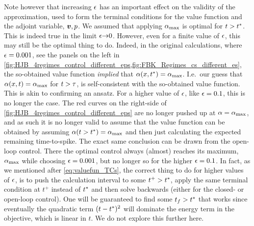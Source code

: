 \documentclass[12pt]{iopart}
\begin{document}
Note however that increasing ${\epsilon}$ has an important effect on the validity of
the approximation, used to form the terminal conditions for
the value function and the adjoint variable, ${ \boldsymbol{v} },p$. We assumed that applying
${ {\alpha}_{\textrm{max}} }$ is optimal for $t>{ t^* }$. This is indeed true in the
limit ${\epsilon} {\rightarrow} 0$. However, even for a finite value of ${\epsilon}$, this may still
be the optimal thing to do. Indeed, in the original calculations,
where ${\epsilon}=0.001$, see the panels on the left in
\cref{fig:HJB_4regimes_control_different_eps,fig:FBK_Regimes_cs_different_es},
the so-obtained value function {\sl implied} that ${\alpha}(x,{ t^* }) = { {\alpha}_{\textrm{max}} }$.
I.e.\ our
guess that ${\alpha}(x, t) = { {\alpha}_{\textrm{max}} }$ for $t > {\tau}$, is self-consistent with the
so-obtained value function. This is akin to confirming an ansatz.
For a higher value of ${\epsilon}$, like ${\epsilon} = 0.1$, this is no longer the case. The red
curves on the right-side of \cref{fig:HJB_4regimes_control_different_eps} are no
longer pushed up at ${\alpha} = { {\alpha}_{\textrm{max}} }$, and as such it is no longer valid to
assume that the value function can be obtained by assuming ${\alpha}(t>{ t^* }) = { {\alpha}_{\textrm{max}} }$
and then just calculating the expected remaining time-to-spike.
The exact same conclusion can be drawn from the open-loop control. There the
optimal control always (almost) reaches its maximum, ${ {\alpha}_{\textrm{max}} }$ while choosing
${\epsilon} = 0.001$, but no longer so for the higher ${\epsilon} = 0.1$.
In fact, as we mentioned after \cref{eq:valuefun_TCs}, the correct thing to do
for higher values of ${\epsilon}$, is to push the
calculation interval to some $t^+ > { t^* }$, apply the same terminal condition at
$t^+$ instead of ${ t^* }$ and then solve backwards (either for the closed- or
open-loop control). One will be guaranteed to find some $t_f > { t^* }$ that works
since eventually the quadratic term $(t-{ t^* })^2$ will dominate the energy term in
the objective, which is linear in $t$. We do not explore this further here.
\end{document}
